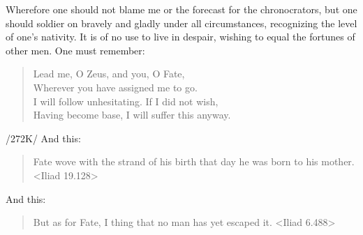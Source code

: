 Wherefore one should not blame me or the forecast for the chronocrators, but one should soldier on bravely and gladly under all circumstances, recognizing the level of one’s nativity. It is of no use to live in despair, wishing to equal the fortunes of other men. One must remember: 

\begin{verse}
Lead me, O Zeus, and you, O Fate, \\
Wherever you have assigned me to go. \\
I will follow unhesitating. If I did not wish,  \\
Having become base, I will suffer this anyway. \\
\end{verse}

/272K/ And this:
\begin{verse}
Fate wove with the strand of his birth that day he was born to his mother. <Iliad 19.128>
\end{verse}

And this:
\begin{verse}
But as for Fate, I thing that no man has yet escaped it. <Iliad 6.488>
\end{verse}

\newpage